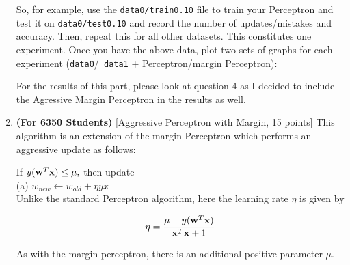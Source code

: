 \begin{enumerate}
  So, for example, use the {\tt data0/train0.10} file to train your
  Perceptron and test it on {\tt data0/test0.10} and record the number
  of updates/mistakes and accuracy. Then, repeat this for all other
  datasets. This constitutes one experiment. Once you have the above
  data, plot two sets of graphs for each experiment ({\tt data0}/{\tt
    data1} + Perceptron/margin Perceptron):
  \begin{center}
  \end{center}

  For the results of this part, please look at question 4 as I decided to
  include the Agressive Margin Perceptron in the results as well.

\item\textbf{(For 6350 Students)} [Aggressive Perceptron with Margin,
  15 points] This algorithm is an extension of the margin Perceptron
  which performs an aggressive update as follows:

  If $y({\bf w}^T {\bf x}) \leq \mu,$ then update\\
  (a) $w_{new} \leftarrow w_{old} + \eta yx$\\

  Unlike the standard Perceptron algorithm, here the learning rate
  $\eta$ is given by

  \begin{align*}
    \eta = \frac{\mu - y({\bf w}^T {\bf x}) }{{\bf x}^T {\bf x} +1}
  \end{align*}

  As with the margin perceptron, there is an additional positive
  parameter $\mu$.


\end{enumerate}
